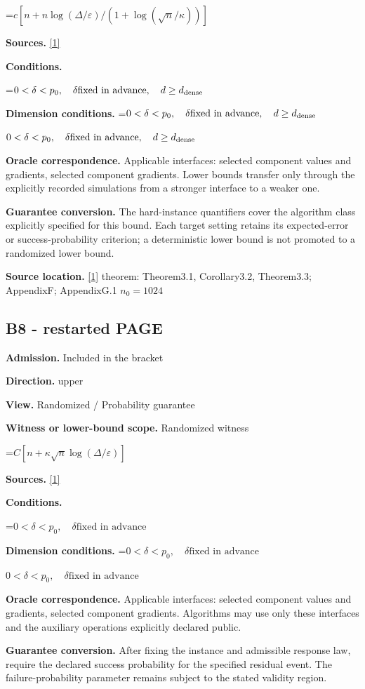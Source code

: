 \documentclass[10pt,a4paper]{article}
\newcommand{\AtlasMath}[1]{\par\begingroup\centering\setbox0=\hbox{$\displaystyle #1$}\ifdim\wd0>1.4\linewidth\typeout{ATLAS WIDE FORMULA: \the\wd0}\fi\ifdim\wd0>\linewidth\resizebox{\linewidth}{!}{\box0}\else\box0\fi\par\endgroup}
\newcommand{\AtlasInlineMath}[1]{\begingroup\setbox0=\hbox{$#1$}\ifdim\wd0>.4\linewidth\endgroup\AtlasMath{#1}\else\endgroup$#1$\fi}
\begin{document}
\AtlasMath{c[n+n\log(\Delta/\varepsilon)/(1+\log(\sqrt n/\kappa))]}
\textbf{Sources.} \href{https://arxiv.org/pdf/2609.00045v3}{[1]}

\textbf{Conditions.} 
\AtlasMath{0<\delta<p_0,\quad\delta\text{fixed in advance},\quad d\ge d_{\rm dense}}


\textbf{Dimension conditions.} \AtlasInlineMath{0<\delta<p_0,\quad\delta\text{fixed in advance},\quad d\ge d_{\rm dense}}

\textbf{Oracle correspondence.} Applicable interfaces: selected component values and gradients, selected component gradients. Lower bounds transfer only through the explicitly recorded simulations from a stronger interface to a weaker one.

\textbf{Guarantee conversion.} The hard-instance quantifiers cover the algorithm class explicitly specified for this bound. Each target setting retains its expected-error or success-probability criterion; a deterministic lower bound is not promoted to a randomized lower bound.

\textbf{Source location.} \href{https://arxiv.org/pdf/2609.00045v3}{[1]} theorem: Theorem3.1, Corollary3.2, Theorem3.3; AppendixF; AppendixG.1 $n_0=1024$

\subsection{B8 - restarted PAGE}
\textbf{Admission.} Included in the bracket

\textbf{Direction.} upper

\textbf{View.} Randomized / Probability guarantee

\textbf{Witness or lower-bound scope.} Randomized witness

\AtlasMath{C[n+\kappa\sqrt n\log(\Delta/\varepsilon)]}
\textbf{Sources.} \href{https://arxiv.org/pdf/2609.00045v3}{[1]}

\textbf{Conditions.} 
\AtlasMath{0<\delta<p_0,\quad\delta\text{fixed in advance}}


\textbf{Dimension conditions.} \AtlasInlineMath{0<\delta<p_0,\quad\delta\text{fixed in advance}}

\textbf{Oracle correspondence.} Applicable interfaces: selected component values and gradients, selected component gradients. Algorithms may use only these interfaces and the auxiliary operations explicitly declared public.

\textbf{Guarantee conversion.} After fixing the instance and admissible response law, require the declared success probability for the specified residual event. The failure-probability parameter remains subject to the stated validity region.
\end{document}
